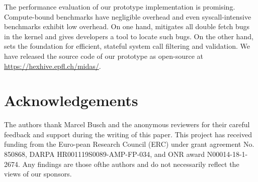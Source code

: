 \documentclass[letterpaper,twocolumn,10pt]{article}
\begin{document}
The performance evaluation of our prototype implementation is promising.
Compute-bound benchmarks have negligible overhead and even syscall-intensive
benchmarks exhibit low overhead. On one hand, \midas mitigates all double fetch
bugs in the kernel and gives developers a tool to locate such bugs. On the other
hand, \midas sets the foundation for efficient, stateful system call filtering
and validation. 
%
We have released the source code of our prototype as open-source at 
\url{https://hexhive.epfl.ch/midas/}.

\section*{Acknowledgements}
The authors thank Marcel Busch and the anonymous reviewers for their careful
feedback and support during the writing of this 
paper. 
%
This project has received funding from the Euro-pean Research Council (ERC)
under grant agreement No. 850868, DARPA HR001119S0089-AMP-FP-034, and ONR award
N00014-18-1-2674. Any findings are those ofthe authors and do not necessarily
reflect the views of our sponsors.


\balance



\end{document}

